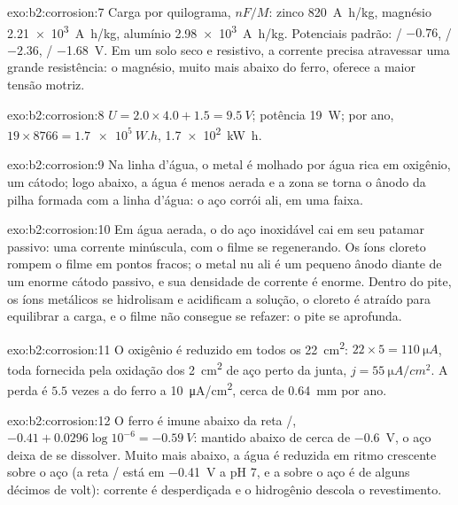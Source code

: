 \begin{solution}{exo:b2:corrosion:7}
Carga por quilograma, $nF/M$: zinco \qty{820}{A.h/kg}, magnésio \qty{2.21e3}{A.h/kg},
alumínio \qty{2.98e3}{A.h/kg}. Potenciais padrão: / $-0.76$,
/ $-2.36$, / \qty{-1.68}{V}. Em um solo seco e
resistivo, a corrente precisa atravessar uma grande resistência: o magnésio,
muito mais abaixo do ferro, oferece a maior tensão motriz.
\end{solution}

\begin{solution}{exo:b2:corrosion:8}
$U = 2.0 \times 4.0 + 1.5 = \qty{9.5}{V}$; potência \qty{19}{W}; por ano, $19 \times
8766 = \qty{1.7e5}{W.h}$, \qty{1.7e2}{kW.h}.
\end{solution}

\begin{solution}{exo:b2:corrosion:9}
Na linha d'água, o metal é molhado por água rica em oxigênio, um cátodo; logo
abaixo, a água é menos aerada e a zona se torna o ânodo da pilha formada com
a linha d'água: o aço corrói ali, em uma faixa.
\end{solution}

\begin{solution}{exo:b2:corrosion:10}
Em água aerada, o  do aço inoxidável cai em seu patamar
passivo: uma corrente minúscula, com o filme se regenerando. Os íons cloreto
rompem o filme em pontos fracos; o metal nu ali é um pequeno ânodo diante de
um enorme cátodo passivo, e sua densidade de corrente é enorme. Dentro do
pite, os íons metálicos se hidrolisam e acidificam a solução, o cloreto é
atraído para equilibrar a carga, e o filme não consegue se refazer: o pite
se aprofunda.
\end{solution}

\begin{solution}{exo:b2:corrosion:11}
O oxigênio é reduzido em todos os \qty{22}{cm^2}:  $22 \times 5 =
\qty{110}{\micro A}$, toda fornecida pela oxidação dos \qty{2}{cm^2} de aço
perto da junta, $j = \qty{55}{\micro A/cm^2}$. A perda é $5.5$ vezes a do ferro
a \qty{10}{\micro A/cm^2}, cerca de \qty{0.64}{mm} por ano.
\end{solution}

\begin{solution}{exo:b2:corrosion:12}
O ferro é imune abaixo da reta /, $-0.41 + 0.0296\log 10^{-6} =
\qty{-0.59}{V}$: mantido abaixo de cerca de \qty{-0.6}{V}, o aço deixa de se
dissolver. Muito mais abaixo, a água é reduzida em ritmo crescente sobre o aço
(a reta / está em \qty{-0.41}{V} a pH 7, e a  sobre o aço é
de alguns décimos de volt): corrente é desperdiçada e o hidrogênio descola o
revestimento.
\end{solution}

